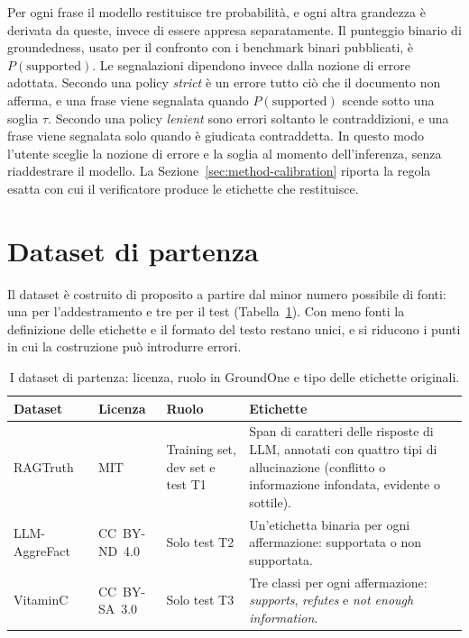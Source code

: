 Per ogni frase il modello restituisce tre probabilità, e ogni altra grandezza è derivata da queste, invece di essere
appresa separatamente. Il punteggio binario di groundedness, usato per il confronto con i benchmark binari pubblicati, è
$P(\text{supported})$. Le segnalazioni dipendono invece dalla nozione di errore adottata. Secondo una policy
\emph{strict} è un errore tutto ciò che il documento non afferma, e una frase viene segnalata quando
$P(\text{supported})$ scende sotto una soglia $\tau$. Secondo una policy \emph{lenient} sono errori soltanto le
contraddizioni, e una frase viene segnalata solo quando è giudicata contraddetta. In questo modo l'utente sceglie la
nozione di errore e la soglia al momento dell'inferenza, senza riaddestrare il modello. La
Sezione~\ref{sec:method-calibration} riporta la regola esatta con cui il verificatore produce le etichette che
restituisce.

\section{Dataset di partenza}
\label{sec:data-sources}

Il dataset è costruito di proposito a partire dal minor numero possibile di fonti: una per l'addestramento e tre per il
test (Tabella~\ref{tab:data-sources}). Con meno fonti la definizione delle etichette e il formato del testo restano
unici, e si riducono i punti in cui la costruzione può introdurre errori.

\begin{table}[htbp]
\centering
\caption{I dataset di partenza: licenza, ruolo in GroundOne e tipo delle etichette originali.}
\label{tab:data-sources}
\small
\begin{tabularx}{\textwidth}{@{}>{\raggedright\arraybackslash}p{}>{\raggedright\arraybackslash}p{}>{\raggedright\arraybackslash}p{}>{\raggedright\arraybackslash}X@{}}
\toprule
Dataset & Licenza & Ruolo & Etichette \\
\midrule
RAGTruth~\cite{niu2024ragtruth} & MIT & Training set, dev set e test T1 & Span di caratteri delle risposte di LLM, annotati con quattro tipi di allucinazione (conflitto o informazione infondata, evidente o sottile). \\ \addlinespace
\mbox{LLM-AggreFact}~\cite{tang2024minicheck,llmaggrefact} & \mbox{CC BY-ND 4.0} & Solo test T2 & Un'etichetta binaria per ogni affermazione: supportata o non supportata. \\ \addlinespace
VitaminC~\cite{schuster2021vitaminc} & \mbox{CC BY-SA 3.0} & Solo test T3 & Tre classi per ogni affermazione: \emph{supports}, \emph{refutes} e \emph{not enough information}. \\
\bottomrule
\end{tabularx}
\end{table}


